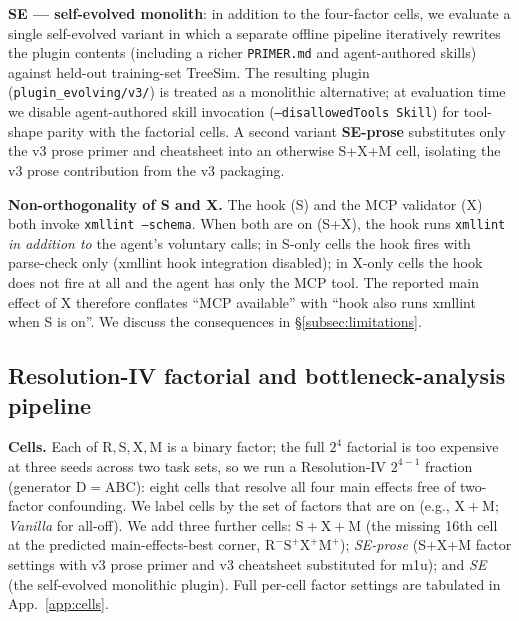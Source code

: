 \documentclass{article}
\begin{document}
\textbf{SE --- self-evolved monolith}: in addition to the four-factor cells, we evaluate a single self-evolved variant in which a separate offline pipeline iteratively rewrites the plugin contents (including a richer \texttt{PRIMER.md} and agent-authored skills) against held-out training-set TreeSim. The resulting plugin (\texttt{plugin\_evolving/v3/}) is treated as a monolithic alternative; at evaluation time we disable agent-authored skill invocation (\texttt{--disallowedTools Skill}) for tool-shape parity with the factorial cells. A second variant \textbf{SE-prose} substitutes only the v3 prose primer and cheatsheet into an otherwise S+X+M cell, isolating the v3 prose contribution from the v3 packaging.

\textbf{Non-orthogonality of S and X.} The hook (S) and the MCP validator (X) both invoke \texttt{xmllint --schema}. When both are on (S+X), the hook runs \texttt{xmllint} \emph{in addition to} the agent's voluntary calls; in S-only cells the hook fires with parse-check only (xmllint hook integration disabled); in X-only cells the hook does not fire at all and the agent has only the MCP tool. The reported main effect of X therefore conflates ``MCP available'' with ``hook also runs xmllint when S is on''. We discuss the consequences in \S\ref{subsec:limitations}.

\subsection{Resolution-IV factorial and bottleneck-analysis pipeline}
\label{subsec:cells}

\textbf{Cells.} Each of $\mathrm{R, S, X, M}$ is a binary factor; the full $2^4$ factorial is too expensive at three seeds across two task sets, so we run a Resolution-IV $2^{4-1}$ fraction (generator $\mathrm{D}{=}\mathrm{ABC}$): eight cells that resolve all four main effects free of two-factor confounding. We label cells by the set of factors that are on (e.g., $\mathrm{X+M}$; \emph{Vanilla} for all-off). We add three further cells: $\mathrm{S+X+M}$ (the missing 16th cell at the predicted main-effects-best corner, $\mathrm{R}^{-}\mathrm{S}^{+}\mathrm{X}^{+}\mathrm{M}^{+}$); \emph{SE-prose} (S+X+M factor settings with v3 prose primer and v3 cheatsheet substituted for m1u); and \emph{SE} (the self-evolved monolithic plugin). Full per-cell factor settings are tabulated in App.~\ref{app:cells}.
\end{document}
